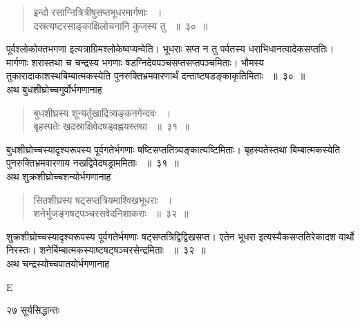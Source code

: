 \documentclass[11pt, openany]{book}
\begin{document}
 
 \begin{quote}
 {\ssi इन्दो रसाग्नित्रित्रीषुसप्तभूधरमार्गणाः ~।\\
दस्रत्यष्टरसाङ्काक्षिलोचनानि कुजस्य तु ~॥~३०~॥}
\end{quote}
\begin{sloppypar}
 पूर्वश्लोकोक्तभगणा इत्यत्राग्रिमश्लोकेष्वप्यन्वेति। भूधराः सप्त न तु पर्वतस्य धराभिधानत्वादेकसप्ततिः। मार्गणाः शरास्तथा च चन्द्रस्य भगणाः षडग्निदेवपञ्चसप्तसप्तपञ्चमिताः। भौमस्य तुकारादाकाशस्थबिम्बात्मकस्येति पुनरुक्तिभ्रमवारणार्थं दन्ताष्टषडङ्काकृतिमिताः ~॥~३०~॥\\ 
 \noindent अथ बुधशीघ्रोच्चगुर्वोर्भगणानाह\textendash
\end{sloppypar}
\begin{quote}
 
  {\ssi बुधशीघ्रस्य शून्यर्तुखाद्रित्र्यङ्कनगेन्दवः ~।\\
बृहस्पतेः खदस्राक्षिवेदषड्वह्नयस्तथा ~॥~३१~॥}
\end{quote}
\begin{sloppypar}
 बुधशीघ्रोच्चस्यादृश्यरूपस्य पूर्वगतेर्भगणाः षष्टिसप्ततित्र्यङ्कात्यष्टिमिताः। बृहस्पतेस्तथा बिम्बात्मकस्येति पुनरुक्तिभ्रमवारणाय नखद्विवेदषड्राममिताः ~॥~३१~॥\\ 
 \noindent अथ शुक्रशीघ्रोच्चशन्योर्भगणानाह\textendash
\end{sloppypar}
\begin{quote}
 
 {\ssi सितशीघ्रस्य षट्सप्तत्रियमाश्विखभूधराः ~।\\
शनेर्भुजङ्गषट्पञ्चरसवेदनिशाकराः ~॥~३२~॥ }
\end{quote}
\begin{sloppypar}
शुक्रशीघ्रोच्चस्यादृश्यरूपस्य पूर्वगतेर्भगणाः षट्सप्तत्रिद्विद्विखसप्त। एतेन भूधरा इत्यस्यैकसप्ततिरेकादश वार्थो निरस्तः। शनेर्बिम्बात्मकस्याष्टषट्षञ्चरसेन्द्रमिताः ~॥~३२~॥\\ 
\noindent अथ चन्द्रस्योच्चपातयोर्भगणानाह\textendash
\end{sloppypar}

{\tiny{E}}

\newpage

\noindent २७ \hspace{4cm} सूर्यसिद्धान्तः
\vspace{1cm}
\end{document}
